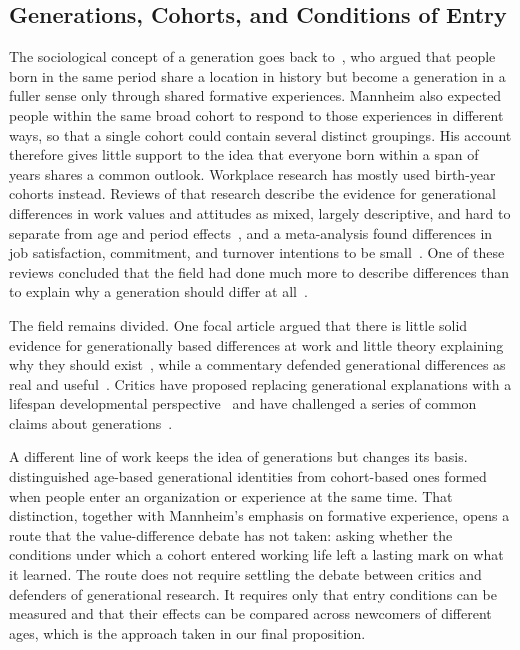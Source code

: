 \subsection{Generations, Cohorts, and Conditions of Entry}

The sociological concept of a generation goes back to~\citet{mannheim1952problem}, who argued that people born in the same period share a location in history but become a generation in a fuller sense only through shared formative experiences. Mannheim also expected people within the same broad cohort to respond to those experiences in different ways, so that a single cohort could contain several distinct groupings. His account therefore gives little support to the idea that everyone born within a span of years shares a common outlook. Workplace research has mostly used birth-year cohorts instead. Reviews of that research describe the evidence for generational differences in work values and attitudes as mixed, largely descriptive, and hard to separate from age and period effects~\citep{parry2011generational,lyons2014generational}, and a meta-analysis found differences in job satisfaction, commitment, and turnover intentions to be small~\citep{costanza2012generational}. One of these reviews concluded that the field had done much more to describe differences than to explain why a generation should differ at all~\citep{lyons2014generational}.

The field remains divided. One focal article argued that there is little solid evidence for generationally based differences at work and little theory explaining why they should exist~\citep{costanza2015generationally}, while a commentary defended generational differences as real and useful~\citep{campbell2015generational}. Critics have proposed replacing generational explanations with a lifespan developmental perspective~\citep{rudolph2017considering} and have challenged a series of common claims about generations~\citep{rudolph2021generations}.

A different line of work keeps the idea of generations but changes its basis. \citet{joshi2010unpacking} distinguished age-based generational identities from cohort-based ones formed when people enter an organization or experience at the same time. That distinction, together with Mannheim's emphasis on formative experience, opens a route that the value-difference debate has not taken: asking whether the conditions under which a cohort entered working life left a lasting mark on what it learned. The route does not require settling the debate between critics and defenders of generational research. It requires only that entry conditions can be measured and that their effects can be compared across newcomers of different ages, which is the approach taken in our final proposition.

